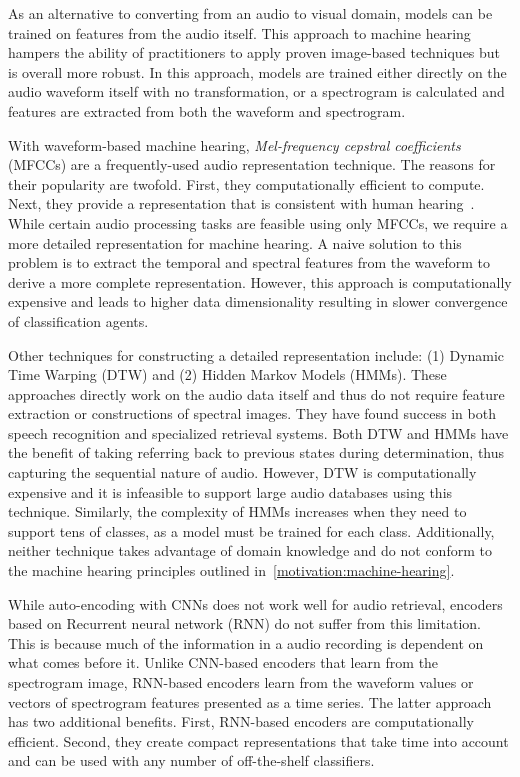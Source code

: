 As an alternative to converting from an audio to visual domain, models can be trained on features from the audio itself. This approach to machine hearing hampers the ability of practitioners to apply proven image-based techniques but is overall more robust. In this approach, models are trained either directly on the audio waveform itself with no transformation, or a spectrogram is calculated and features are extracted from both the waveform and spectrogram.

With waveform-based machine hearing, \textit{Mel-frequency cepstral
coefficients} (MFCCs) are a frequently-used audio representation technique. 
The reasons for their popularity are twofold. First, they computationally
efficient to compute. Next, they provide a representation that is consistent
with human hearing~\cite{kaur-feature-2015}.
While certain audio processing tasks are feasible using only MFCCs, we require 
a more detailed representation for machine hearing.
A naive solution to this problem is to extract the temporal and spectral
features from the waveform to derive a more complete representation.
However, this approach is computationally expensive and leads to higher data
dimensionality resulting in slower convergence of classification agents.

Other techniques for constructing a detailed representation include: (1) 
Dynamic Time Warping (DTW) and (2) Hidden Markov Models (HMMs).
These approaches directly work on the audio data itself and thus do not require
feature extraction or constructions of spectral images.
They have found success in both speech recognition and specialized retrieval
systems.
Both DTW and HMMs have the benefit of taking referring back to previous states during determination, thus capturing the sequential nature 
of audio. 
However, DTW is computationally expensive and it is infeasible to support 
large audio databases using this technique.
Similarly, the complexity of HMMs increases when they need to support tens of
classes, as a model must be trained for each class.
Additionally, neither technique takes advantage of domain knowledge 
and do not conform to the machine hearing principles outlined
in~\autoref{motivation:machine-hearing}.

While auto-encoding with CNNs does not work well for audio retrieval,
encoders based on Recurrent neural network (RNN) do not suffer from this
limitation.
This is because much of the information in a audio recording is dependent 
on what comes before it.
Unlike CNN-based encoders that learn from the spectrogram image,
RNN-based encoders learn from the waveform values or vectors of spectrogram
features presented as a time series.
The latter approach has two additional benefits.
First, RNN-based encoders are computationally efficient.
Second, they create compact representations that take time into account 
and can be used with any number of off-the-shelf classifiers.

